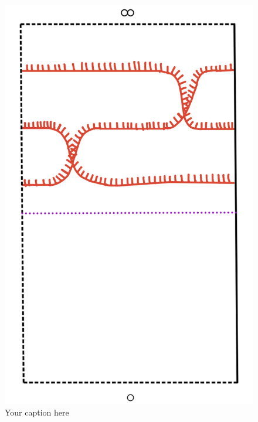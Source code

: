 \begin{figure}[H] %
    \centering
    \includegraphics[scale = 0.95]{diagrams/natural_alternating_diagrams/5.png} %
    \caption{Your caption here}
    \label{fig:your-label}
\end{figure}

